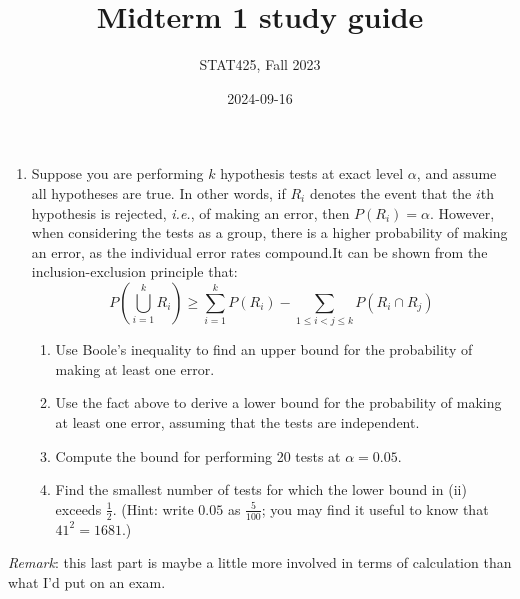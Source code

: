 \documentclass[
  letterpaper,
  DIV=11,
  numbers=noendperiod]{scrartcl}
\title{Midterm 1 study guide}
\author{STAT425, Fall 2023}
\date{2024-09-16}
\providecommand{\tightlist}{%
  \setlength{\itemsep}{0pt}\setlength{\parskip}{0pt}}\usepackage{longtable,booktabs,array}
\begin{document}
\maketitle

\pagestyle{fancy}  

\begin{enumerate}
\def\labelenumi{\arabic{enumi}.}
\tightlist
\item
  Suppose you are performing \(k\) hypothesis tests at exact level
  \(\alpha\), and assume all hypotheses are true. In other words, if
  \(R_i\) denotes the event that the \(i\)th hypothesis is rejected,
  \emph{i.e.}, of making an error, then \(P(R_i) = \alpha\). However,
  when considering the tests as a group, there is a higher probability
  of making an error, as the individual error rates compound.It can be
  shown from the inclusion-exclusion principle that: \[
  P\left(\bigcup_{i = 1}^k R_i\right) \geq \sum_{i = 1}^k P(R_i) - \sum_{1 \leq i < j \leq k} P(R_i \cap R_j)
  \]

  \begin{enumerate}
  \def\labelenumii{\roman{enumii}.}
  \tightlist
  \item
    Use Boole's inequality to find an upper bound for the probability of
    making at least one error.
  \item
    Use the fact above to derive a lower bound for the probability of
    making at least one error, assuming that the tests are independent.
  \item
    Compute the bound for performing 20 tests at \(\alpha = 0.05\).
  \item
    Find the smallest number of tests for which the lower bound in (ii)
    exceeds \(\frac{1}{2}\). (Hint: write \(0.05\) as \(\frac{5}{100}\);
    you may find it useful to know that \(41^2 = 1681\).)
  \end{enumerate}
\end{enumerate}

\emph{Remark}: this last part is maybe a little more involved in terms
of calculation than what I'd put on an exam.
\end{document}
